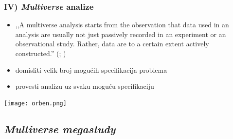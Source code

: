 \documentclass[aspectratio=169]{beamer}
\newcommand{\tinycitep}[1]{%
    \bgroup
    \scriptsize
    \citep{#1}
    \egroup}
\begin{document}
\begin{frame}
    \frametitle{IV) \textit{Multiverse} analize}

    \begin{itemize}
        \item ,,A multiverse analysis starts from the observation that data used
            in an analysis are usually not just passively recorded in an
            experiment or an observational study.  Rather, data are to a certain
            extent actively constructed.''
            \bgroup
            \scriptsize
            (\citealp*[str. 702]{steegenIncreasingTransparencyMultiverse2016};
            \citealp*[za sličan pristup
            vidi][]{simonsohnSpecificationCurveDescriptive2015})
            \egroup

        \pause

        \item domisliti velik broj mogućih specifikacija problema

        \item provesti analizu uz svaku moguću specifikaciju

    \end{itemize}

\end{frame}

\begin{frame}
    \centering
    \texttt{[image: orben.png]}


    \tinycitep{orbenAssociationAdolescentWellbeing2019}
\end{frame}

\subsection{\textit{Multiverse megastudy}}
\end{document}
